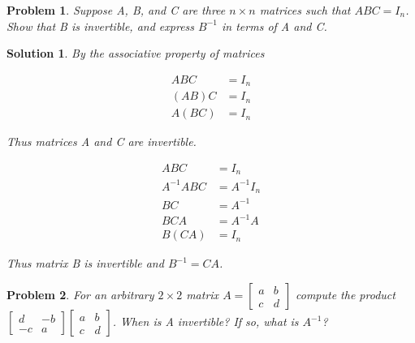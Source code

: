 \documentclass{article}
\newtheorem{problem}{Problem}
\newtheorem*{solution}{Solution}
\begin{document}
\begin{problem}
Suppose A, B, and C are three $n \times n$ matrices such that $ABC = I_{n}$. Show that B is invertible, and express $B^{-1}$ in terms of A and C.
\end{problem}

\begin{solution}
By the associative property of matrices

\begin{align*}
ABC &= I_{n} \\
(AB)C &= I_{n} \\
A(BC) &= I_{n} 
\end{align*}

Thus matrices A and C are invertible. 

\begin{align*}
ABC &= I_{n} \\
A^{-1}ABC &= A^{-1} I_{n} \\
BC &= A^{-1} \\
BCA &= A^{-1} A \\
B(CA) &= I_{n}
\end{align*}

Thus matrix B is invertible and $B^{-1} = CA$.

\end{solution}

\begin{problem}
For an arbitrary $2 \times 2$ matrix $A = \begin{bmatrix} a & b \\ c & d \end{bmatrix}$ compute the product $\begin{bmatrix}d & -b \\ -c & a \end{bmatrix} \begin{bmatrix}a & b \\ c & d \end{bmatrix}$. When is A invertible? If so, what is $A^{-1}$?
\end{problem}
\end{document}
